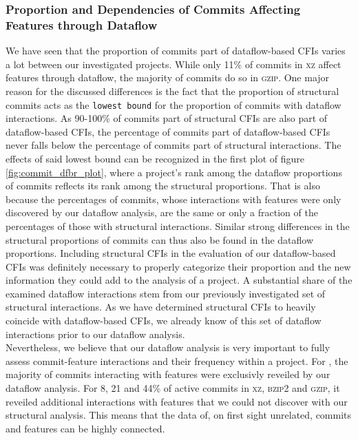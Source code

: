 \subsubsection*{Proportion and Dependencies of Commits Affecting Features through Dataflow}

We have seen that the proportion of commits part of dataflow-based CFIs varies a lot between our investigated projects.
While only 11\% of commits in \textsc{xz} affect features through dataflow, the majority of commits do so in \textsc{gzip}.
One major reason for the discussed differences is the fact that the proportion of structural commits acts as the \texttt{lowest bound} for the proportion of commits with dataflow interactions.
As 90-100\% of commits part of structural CFIs are also part of dataflow-based CFIs, the percentage of commits part of dataflow-based CFIs never falls below the percentage of commits part of structural interactions.
The effects of said lowest bound can be recognized in the first plot of figure \ref{fig:commit_dfbr_plot}, where a project's rank among the dataflow proportions of commits reflects its rank among the structural proportions.
That is also because the percentages of commits, whose interactions with features were only discovered by our dataflow analysis, are the same or only a fraction of the percentages of those with structural interactions.
Similar strong differences in the structural proportions of commits can thus also be found in the dataflow proportions.
Including structural CFIs in the evaluation of our dataflow-based CFIs was definitely necessary to properly categorize their proportion and the new information they could add to the analysis of a project.
A substantial share of the examined dataflow interactions stem from our previously investigated set of structural interactions.
As we have determined structural CFIs to heavily coincide with dataflow-based CFIs, we already know of this set of dataflow interactions prior to our dataflow analysis. \\
Nevertheless, we believe that our dataflow analysis is very important to fully assess commit-feature interactions and their frequency within a project.
For , the majority of commits interacting with features were exclusivly reveiled by our dataflow analysis.
For 8, 21 and 44\% of active commits in \textsc{xz}, \textsc{bzip2} and \textsc{gzip}, it reveiled additional interactions with features that we could not discover with our structural analysis.
This means that the data of, on first sight unrelated, commits and features can be highly connected. 
